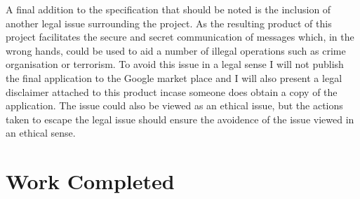 \documentclass[a4paper,11pt]{article}
\begin{document}
A final addition to the specification that should be noted is the inclusion of another legal issue surrounding the project. As the resulting product of this project facilitates the secure and secret communication of messages which, in the wrong hands, could be used to aid a number of illegal operations such as crime organisation or terrorism. To avoid this issue in a legal sense I will not publish the final application to the Google market place and I will also present a legal disclaimer attached to this product incase someone does obtain a copy of the application. The issue could also be viewed as an ethical issue, but the actions taken to escape the legal issue should ensure the avoidence of the issue viewed in an ethical sense. 

\section{Work Completed}
\end{document}

